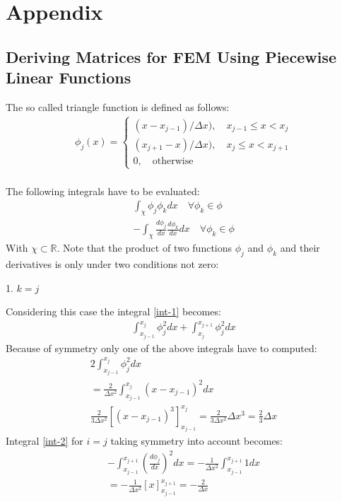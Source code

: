 \chapter{Appendix}
\section{Deriving Matrices for FEM Using Piecewise Linear Functions} \label{ap-mat-der}
The so called triangle function is defined as follows:
\begin{gather}
    \phi_j(x)= 
\begin{cases}
    (x - x_{j-1}) / \Delta x), \quad x_{j-1} \leq x <  x_{j}\\
    (x_{j+1} - x) / \Delta x), \quad x_{j} \leq x <  x_{j + 1}\\
    0,              \quad \text{otherwise}
\end{cases} \label{def-phi}
\end{gather}
\cite{Gustafsson2011d} \\
The following integrals have to be evaluated:
\begin{gather}
\int_{\chi} \phi_{j}\phi_{k}dx \quad \forall \phi_{k} \in \phi   \label{int-1} \\
-\int_{\chi} \frac{d\phi_{j}}{dx}\frac{d\phi_{k}}{dx}dx  \quad \forall \phi_{k} \in \phi  \label{int-2}
\end{gather}
With \(\chi \subset \mathbb{R}\). 
Note that the product of two functions \(\phi_j\) and \(\phi_k\) and their derivatives is only under two conditions not zero:

1. \(k = j\)

Considering this case the integral  \ref{int-1} becomes:
\begin{gather}
\int_{x_{j-1}}^{x_{j}} \phi_j^{2} dx + \int_{x_{j}}^{x_{j+1}} \phi_j^{2} dx 
\end{gather}
Because of symmetry only one of the above integrals have to computed:
\begin{gather}
2 \int_{x_{j-1}}^{x_{j}} \phi_j^{2} dx \\
= \frac{2}{\Delta x^2} \int_{x_{j-1}}^{x_{j}} (x-x_{j-1})^{2} dx \\
\frac{2}{3 \Delta x^{2}} \left[ (x - x_{j-1})^3\right]_{x_{j-1}}^{{x_j}} = \frac{2}{3 \Delta x^{2}} \Delta x^3 = \frac{2}{3}\Delta x
\end{gather}
Integral \ref{int-2} for \(i = j\) taking symmetry into account becomes:
\begin{gather}
-\int_{x_{j-1}}^{x_{j+1}} (\frac{d \phi_j}{dx})^2 dx = -\frac{1}{\Delta x^2} \int_{x_{j-1}}^{x_{j+1}} 1 dx\\
 = -\frac{1}{\Delta x^2}  \left[ x \right]_{x_{j-1}}^{x_{j+1}} = -\frac{2}{\Delta x}
\end{gather}

